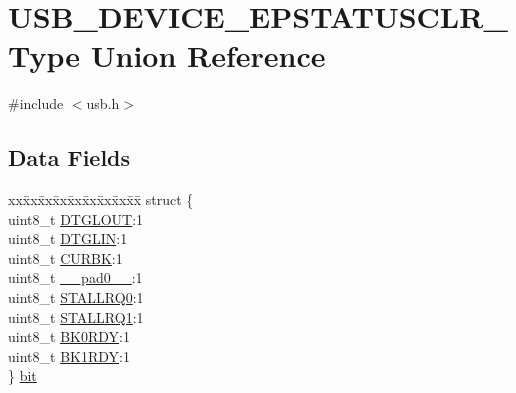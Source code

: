 \hypertarget{union_u_s_b___d_e_v_i_c_e___e_p_s_t_a_t_u_s_c_l_r___type}{}\section{U\+S\+B\+\_\+\+D\+E\+V\+I\+C\+E\+\_\+\+E\+P\+S\+T\+A\+T\+U\+S\+C\+L\+R\+\_\+\+Type Union Reference}
\label{union_u_s_b___d_e_v_i_c_e___e_p_s_t_a_t_u_s_c_l_r___type}


{\ttfamily \#include $<$usb.\+h$>$}

\subsection*{Data Fields}
\begin{DoxyCompactItemize}
\item 
\begin{tabbing}
xx\=xx\=xx\=xx\=xx\=xx\=xx\=xx\=xx\=\kill
struct \{\\
\>uint8\_t \mbox{\hyperlink{union_u_s_b___d_e_v_i_c_e___e_p_s_t_a_t_u_s_c_l_r___type_a343a1d674b60760cbd9b9a227855a18d}{DTGLOUT}}:1\\
\>uint8\_t \mbox{\hyperlink{union_u_s_b___d_e_v_i_c_e___e_p_s_t_a_t_u_s_c_l_r___type_a4d3e03af44b8a3aab6216f737f671b2d}{DTGLIN}}:1\\
\>uint8\_t \mbox{\hyperlink{union_u_s_b___d_e_v_i_c_e___e_p_s_t_a_t_u_s_c_l_r___type_a60af70f2b5f295e7d0fad0cf6c31afb8}{CURBK}}:1\\
\>uint8\_t \mbox{\hyperlink{union_u_s_b___d_e_v_i_c_e___e_p_s_t_a_t_u_s_c_l_r___type_a8b4eebe79ded0459acec2f4950102ba3}{\_\_pad0\_\_}}:1\\
\>uint8\_t \mbox{\hyperlink{union_u_s_b___d_e_v_i_c_e___e_p_s_t_a_t_u_s_c_l_r___type_a1b62d73ab84a16453cfe76dbae8e652c}{STALLRQ0}}:1\\
\>uint8\_t \mbox{\hyperlink{union_u_s_b___d_e_v_i_c_e___e_p_s_t_a_t_u_s_c_l_r___type_aff69880ca0480a1518048272fd4b415c}{STALLRQ1}}:1\\
\>uint8\_t \mbox{\hyperlink{union_u_s_b___d_e_v_i_c_e___e_p_s_t_a_t_u_s_c_l_r___type_ae775e6182e0864ef4c8f1b31e8fc05df}{BK0RDY}}:1\\
\>uint8\_t \mbox{\hyperlink{union_u_s_b___d_e_v_i_c_e___e_p_s_t_a_t_u_s_c_l_r___type_a2bce60d1c409a249682ac9f0abd43e22}{BK1RDY}}:1\\
\} \mbox{\hyperlink{union_u_s_b___d_e_v_i_c_e___e_p_s_t_a_t_u_s_c_l_r___type_a2d2b8e782fadfcf3c34d6652ad5a9fa0}{bit}}\\


\end{tabbing}
\end{DoxyCompactItemize}
